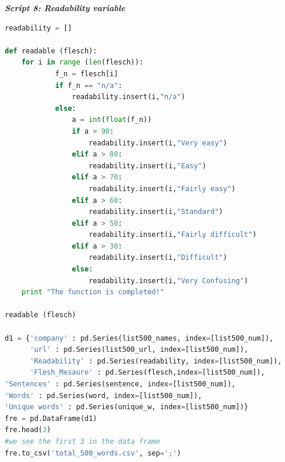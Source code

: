 \documentclass{book}
\begin{document}
\begin{center}
\textit{\textbf{Script 8: Readability variable}}\label{p8}
\end{center}
\begin{lstlisting}[language=Python]
readability = []

def readable (flesch):
    for i in range (len(flesch)):
            f_n = flesch[i]
            if f_n == "n/a":
                readability.insert(i,"n/a")                
            else:
                a = int(float(f_n))
                if a > 90:    
                    readability.insert(i,"Very easy")                    
                elif a > 80:
                    readability.insert(i,"Easy")
                elif a > 70:
                    readability.insert(i,"Fairly easy")
                elif a > 60:
                    readability.insert(i,"Standard")
                elif a > 50:
                    readability.insert(i,"Fairly difficult")
                elif a > 30:
                    readability.insert(i,"Difficult")
                else:
                    readability.insert(i,"Very Confusing")                    
    print "The function is completed!"

readable (flesch)

d1 = {'company' : pd.Series(list500_names, index=[list500_num]),
      'url' : pd.Series(list500_url, index=[list500_num]),
      'Readability' : pd.Series(readability, index=[list500_num]),
      'Flesh_Mesaure' : pd.Series(flesch,index=[list500_num]),
'Sentences' : pd.Series(sentence, index=[list500_num]),
'Words' : pd.Series(word, index=[list500_num]),
'Unique words' : pd.Series(unique_w, index=[list500_num])}
fre = pd.DataFrame(d1)
fre.head(3) 
#we see the first 3 in the data frame
fre.to_csv('total_500_words.csv', sep=';')    
\end{lstlisting}
\end{document}
